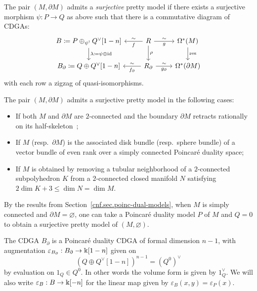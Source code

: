 The pair $(M, \partial M)$ admits a \emph{surjective} pretty model if there exists a surjective morphism $\psi : P \to Q$ as above such that there is a commutative diagram of CDGAs:
\begin{equation}
  \begin{tikzcd}
    B \coloneqq P \oplus_{\psi^{!}} Q^{\vee}[1-n] \dar{\lambda \coloneqq \psi \oplus \id}
    & R \lar{f}[swap]{\sim} \rar{\sim}[swap]{g} \dar{\rho}
    & \Omega^{*}(M) \dar{\operatorname{res}} \\
    B_{\partial} \coloneqq Q \oplus Q^{\vee}[1-n]
    & R_{\partial} \lar{f_{\partial}}[swap]{\sim} \rar{\sim}[swap]{g_{\partial}}
    & \Omega^{*}(\partial M)
  \end{tikzcd}
  \label{cnfbnd.eq.zigzag}
\end{equation}
with each row a zigzag of quasi-isomorphisms.

\begin{theorem}
  \label{cnfbnd.thm.pretty-model}
  The pair $(M, \partial M)$ admits a surjective pretty model in the following cases:
  \begin{itemize}
  \item If both $M$ and $\partial M$ are $2$-connected and the boundary $\partial M$ retracts rationally on its half-skeleton~\cite[Definition~6.1]{CordovaBulensLambrechtsStanley2015};
  \item If $M$ (resp.\ $\partial M$) is the associated disk bundle (resp.\ sphere bundle) of a vector bundle of even rank over a simply connected Poincaré duality space;
  \item If $M$ is obtained by removing a tubular neighborhood of a $2$-connected subpolyhedron $K$ from a $2$-connected closed manifold $N$ satisfying $2 \dim K + 3 \le \dim N = \dim M$.
  \end{itemize}
\end{theorem}

By the results from Section~\ref{cnf.sec.poinc-dual-models}, when $M$ is simply connected and $\partial M = \varnothing$, one can take a Poincaré duality model $P$ of $M$ and $Q = 0$ to obtain a surjective pretty model of $(M, \varnothing)$.

The CDGA $B_{\partial}$ is a Poincaré duality CDGA of formal dimension $n-1$, with augmentation $\varepsilon_{B_{\partial}} : B_{\partial} \to \Bbbk[1-n]$ given on
\[ (Q \oplus Q^{\vee}[1-n])^{n-1} = (Q^{0})^{\vee} \]
by evaluation on $1_{Q} \in Q^{0}$. In other words the volume form is given by $1_{Q}^{\vee}$.
We will also write $\varepsilon_{B} : B \to \Bbbk[-n]$ for the linear map given by $\varepsilon_{B}(x,y) = \varepsilon_{P}(x)$.

